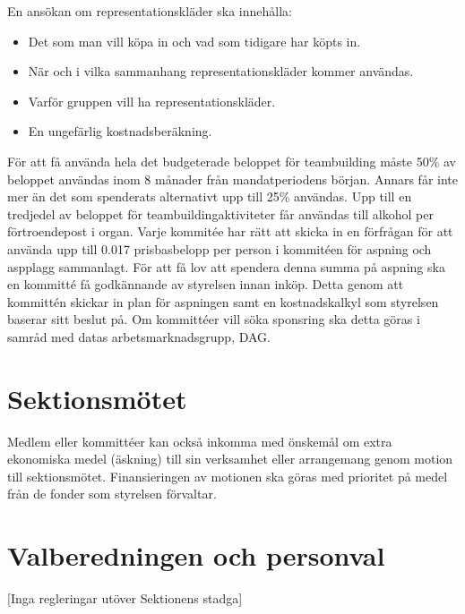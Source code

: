 \documentclass[a4paper]{dteklag}
\begin{document}
\para
En ansökan om representationskläder ska innehålla:
\begin{itemize}
  \item Det som man vill köpa in och vad som tidigare har köpts in.
  \item När och i vilka sammanhang representationskläder kommer användas.
  \item Varför gruppen vill ha representationskläder.
  \item En ungefärlig kostnadsberäkning.
\end{itemize}
\para[Teambuilding] För att få använda hela det budgeterade beloppet för teambuilding måste 50\% av beloppet användas inom 8 månader från mandatperiodens början. Annars får inte mer än det som spenderats alternativt upp till 25\% användas.
\para Upp till en tredjedel av beloppet för teambuildingaktiviteter får användas till alkohol per förtroendepost i organ.
\para [Aspning] Varje kommitée har rätt att skicka in en förfrågan för att använda upp till
0.017 prisbasbelopp per person i kommitéen för aspning och aspplagg sammanlagt. För att
få lov att spendera denna summa på aspning ska en kommitté få godkännande av
styrelsen innan inköp. Detta genom att kommittén skickar in plan för aspningen samt
en kostnadskalkyl som styrelsen baserar sitt beslut på.
\para[Sponsring] Om kommittéer vill söka sponsring ska detta göras i samråd med datas arbetsmarknadsgrupp, DAG.
\section{Sektionsmötet}
\para Medlem eller kommittéer kan också inkomma med önskemål om extra ekonomiska medel (äskning) till sin verksamhet eller arrangemang genom motion till sektionsmötet. Finansieringen av motionen ska göras med prioritet på medel från de fonder som styrelsen förvaltar.
\section{Valberedningen och personval}
\begin{center}
  [Inga regleringar utöver Sektionens stadga]
\end{center}
\end{document}
